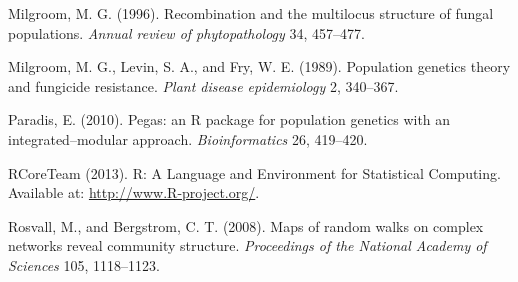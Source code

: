 \documentclass{frontiersSCNS} %
\begin{document}
Milgroom, M. G. (1996). Recombination and the multilocus structure of
fungal populations. \emph{Annual review of phytopathology} 34, 457--477.

Milgroom, M. G., Levin, S. A., and Fry, W. E. (1989). Population
genetics theory and fungicide resistance. \emph{Plant disease
epidemiology} 2, 340--367.

Paradis, E. (2010). Pegas: an R package for population genetics with an
integrated--modular approach. \emph{Bioinformatics} 26, 419--420.

RCoreTeam (2013). R: A Language and Environment for Statistical
Computing. Available at: \url{http://www.R-project.org/}.

Rosvall, M., and Bergstrom, C. T. (2008). Maps of random walks on
complex networks reveal community structure. \emph{Proceedings of the
National Academy of Sciences} 105, 1118--1123.
\end{document}
